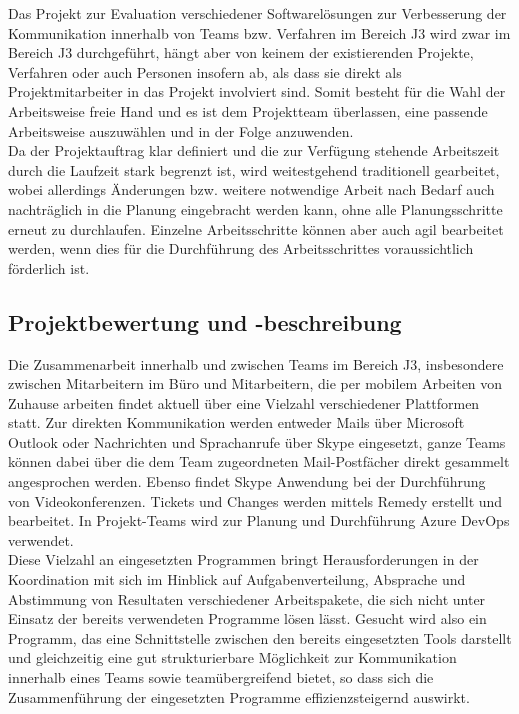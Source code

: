 \documentclass[ThesisDJ.tex]{subfiles}
\begin{document}
	Das Projekt zur Evaluation verschiedener Softwarelösungen zur Verbesserung der Kommunikation innerhalb von Teams bzw. Verfahren im Bereich J3 wird zwar im Bereich J3 durchgeführt, hängt aber von keinem der existierenden Projekte, Verfahren oder auch Personen insofern ab, als dass sie direkt als Projektmitarbeiter in das Projekt involviert sind. Somit besteht für die Wahl der Arbeitsweise freie Hand und es ist dem Projektteam überlassen, eine passende Arbeitsweise auszuwählen und in der Folge anzuwenden.\\
	Da der Projektauftrag klar definiert und die zur Verfügung stehende Arbeitszeit durch die Laufzeit stark begrenzt ist, wird weitestgehend traditionell gearbeitet, wobei allerdings Änderungen bzw. weitere notwendige Arbeit nach Bedarf auch nachträglich in die Planung eingebracht werden kann, ohne alle Planungsschritte erneut zu durchlaufen. Einzelne Arbeitsschritte können aber auch agil bearbeitet werden, wenn dies für die Durchführung des Arbeitsschrittes voraussichtlich förderlich ist.
	
	\subsection{Projektbewertung und -beschreibung}
	Die Zusammenarbeit innerhalb und zwischen Teams im Bereich J3, insbesondere zwischen Mitarbeitern im Büro und Mitarbeitern, die per mobilem Arbeiten von Zuhause arbeiten findet aktuell über eine Vielzahl verschiedener Plattformen statt. Zur direkten Kommunikation werden entweder Mails über Microsoft Outlook oder Nachrichten und Sprachanrufe über Skype eingesetzt, ganze Teams können dabei über die dem Team zugeordneten Mail-Postfächer direkt gesammelt angesprochen werden. Ebenso findet Skype Anwendung bei der Durchführung von Videokonferenzen. Tickets und Changes werden mittels Remedy erstellt und bearbeitet. In Projekt-Teams wird zur Planung und Durchführung Azure DevOps verwendet. \\
	Diese Vielzahl an eingesetzten Programmen bringt Herausforderungen in der Koordination mit sich im Hinblick auf Aufgabenverteilung, Absprache und Abstimmung von Resultaten verschiedener Arbeitspakete, die sich nicht unter Einsatz der bereits verwendeten Programme lösen lässt.
	Gesucht wird also ein Programm, das eine Schnittstelle zwischen den bereits eingesetzten Tools darstellt und gleichzeitig eine gut strukturierbare Möglichkeit zur Kommunikation innerhalb eines Teams sowie teamübergreifend bietet, so dass sich die Zusammenführung der eingesetzten Programme effizienzsteigernd auswirkt.
	
\end{document}
